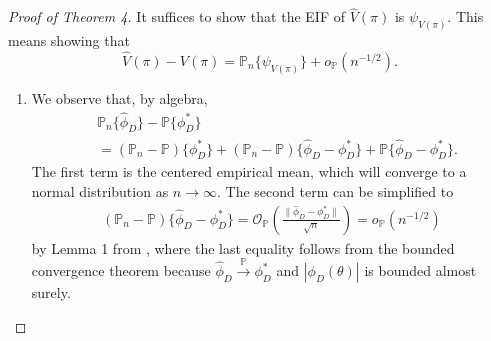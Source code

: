 \documentclass{article}
\newcommand{\wh}{\widehat}
\newcommand{\pr}{\mathbb{P}}
\begin{document}
\begin{proof}[Proof of Theorem 4]
It suffices to show that the EIF of $\wh V(\pi)$ is $\psi_{V(\pi)}$. This means showing that
\[
	\wh V(\pi) - V(\pi) = \pr_n\{\psi_{V(\pi)}\} + o_{\pr}(n^{-1/2}).
\]
\begin{enumerate}
	\item We observe that, by algebra,
	\begin{align*}
		&\pr_n\{ \hat\phi_D \} - \pr\{ \phi_D^* \} \\
		&= (\pr_n - \pr)\{ \phi_D^* \} 
		+ (\pr_n - \pr)\{ \hat\phi_D - \phi_D^* \}
		+ \pr \{ \hat\phi_D - \phi_D^* \}.
	\end{align*}
	The first term is the centered empirical mean, which will converge to a normal distribution as $n \to \infty$. The second term can be simplified to
	\begin{align*}
		(\pr_n - \pr)\{ \hat\phi_D - \phi_D^* \} = \mathcal O_{\pr}\left( \frac{\| \hat\phi_D - \phi_D^* \|}{\sqrt n} \right) = o_{\pr}(n^{-1/2})
	\end{align*}
	by Lemma 1 from \cite{kennedy2023semiparametric},
	where the last equality follows from the bounded convergence theorem because $\hat\phi_D \overset{\pr}{\to} \phi_D^*$ and $|\phi_D(\theta)|$ is bounded almost surely.
	

\end{enumerate}
\end{proof}
\end{document}
